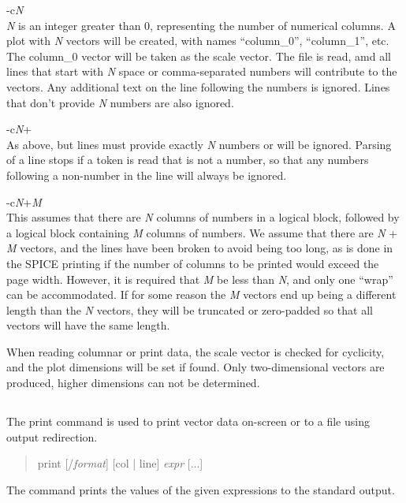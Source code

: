 \begin{description}
\item{\vt -c}{\it N}\\
{\it N} is an integer greater than 0, representing the number of
numerical columns.  A plot with {\it N} vectors will be created,
with names ``{\vt column\_0}'', ``{\vt column\_1}'', etc.  The
{\vt column\_0} vector will be taken as the scale vector.  The file is
read, amd all lines that start with {\it N} space or comma-separated
numbers will contribute to the vectors.  Any additional text on the
line following the numbers is ignored.  Lines that don't provide
{\it N} numbers are also ignored.

\item{\vt -c}{\it N\/}{\vt +}\\
As above, but lines must provide exactly {\it N} numbers or will
be ignored.  Parsing of a line stops if a token is read that is
not a number, so that any numbers following a non-number in the
line will always be ignored.

\item{-c}{\it N\/}{\vt +}{\it M}\\
This assumes that there are {\it N} columns of numbers in a logical
block, followed by a logical block containing {\it M} columns of
numbers.  We assume that there are {\it N} + {\it M} vectors, and the
lines have been broken to avoid being too long, as is done in the
SPICE printing if the number of columns to be printed would exceed the
page width.  However, it is required that {\it M} be less than {\it
N}, and only one ``wrap'' can be accommodated.  If for some reason the
{\it M} vectors end up being a different length than the {\it N}
vectors, they will be truncated or zero-padded so that all vectors
will have the same length.
\end{description}

When reading columnar or print data, the scale vector is checked for
cyclicity, and the plot dimensions will be set if found.  Only
two-dimensional vectors are produced, higher dimensions can not be
determined.

\subsection{}
\label{print}


The {\cb print} command is used to print vector data on-screen or
to a file using output redirection.
\begin{quote}\vt
print [/{\it format\/}] [col | line] {\it expr\/} [...]
\end{quote}
The command prints the values of the given expressions to the standard
output.

